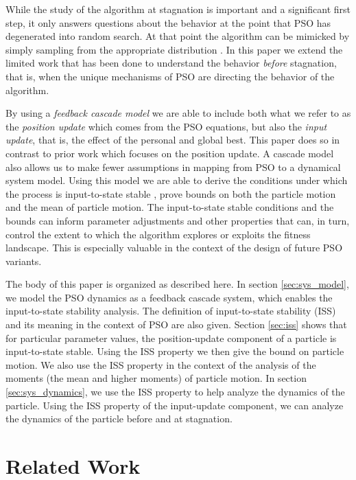 \documentclass{sig-alternate}
\begin{document}
While the study of the algorithm at stagnation is important and a significant first step, it only answers questions about the behavior at the point that PSO has degenerated into random search.
At that point the algorithm can be mimicked by simply sampling from the appropriate distribution \cite{5175367}.
In this paper we extend the limited work that has been done to understand
the behavior \emph{before} stagnation, that is, when the unique mechanisms of PSO are directing the behavior of the algorithm.

By using a \emph{feedback cascade model} we are able to include both what we refer to as the \emph{position update} which comes from the PSO equations, but also the \emph{input update}, that is, the effect of the personal and global best.
This paper does so in contrast to prior work which focuses on the position update.
A cascade model also allows us to make fewer assumptions in mapping from PSO to a dynamical system model.
Using this model we are able to derive the conditions under which the process is input-to-state stable \cite{Jiang2001857}, prove bounds on both the particle motion and the mean of particle motion.
The input-to-state stable conditions and the bounds can inform parameter adjustments and other properties that can, in turn, control the extent to which the algorithm explores or exploits the fitness landscape.
This is especially valuable in the context of the design of future PSO variants. 

The body of this paper is organized as described here.
In section \ref{sec:sys_model}, we model the PSO dynamics as a feedback cascade system, which enables the input-to-state stability analysis.
The definition of input-to-state stability (ISS) and its meaning in the context of PSO are also given.
Section \ref{sec:iss} shows that for particular parameter values, the position-update component of a particle is input-to-state stable. 
Using the ISS property we then give the bound on particle motion.
We also use the ISS property in the context of the analysis of the moments (the mean and higher moments) of particle motion.
In section \ref{sec:sys_dynamics}, we use the ISS property to help analyze the dynamics of the particle.
Using the ISS property of the input-update component, we can analyze the dynamics of the particle before and at stagnation.

\section{Related Work}
\label{sec:relwork}
\end{document}
